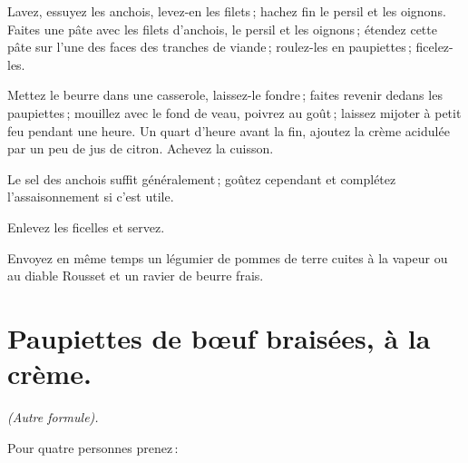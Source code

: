 Lavez, essuyez les anchois, levez-en les filets ; hachez fin le persil et les
oignons. Faites une pâte avec les filets d'anchois, le persil et les oignons ;
étendez cette pâte sur l’une des faces des tranches de viande ; roulez-les en
paupiettes ; ficelez-les.

Mettez le beurre dans une casserole, laissez-le fondre ; faites revenir dedans
les paupiettes ; mouillez avec le fond de veau, poivrez au goût ; laissez
mijoter à petit feu pendant une heure. Un quart d'heure avant la fin, ajoutez
la crème acidulée par un peu de jus de citron. Achevez la cuisson.

Le sel des anchois suffit généralement ; goûtez cependant et complétez
l'assaisonnement si c'est utile.

Enlevez les ficelles et servez.

Envoyez en même temps un légumier de pommes de terre cuites à la vapeur ou au
diable Rousset et un ravier de beurre frais.

\section*{\centering Paupiettes de bœuf braisées, à la crème.}
{}

\begin{center}
\textit{(Autre formule).}
\end{center}

Pour quatre personnes prenez :

\medskip


